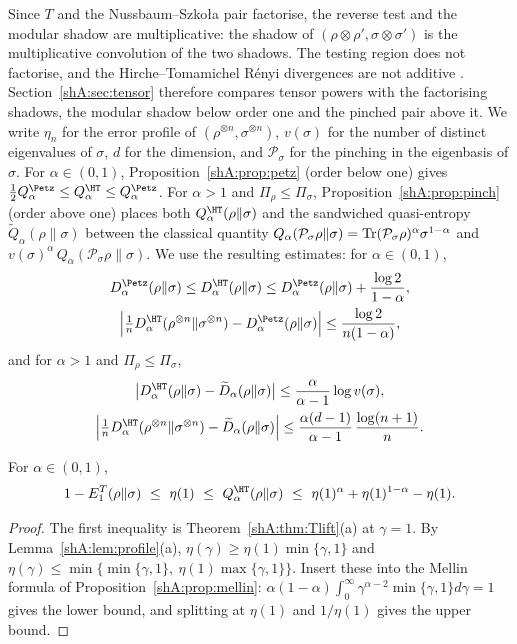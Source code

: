 Since $T$ and the Nussbaum--Szko{\l}a pair factorise, the reverse test and the modular shadow are multiplicative: the shadow of $(\rho\otimes\rho',\sigma\otimes\sigma')$ is the multiplicative convolution of the two shadows. The testing region does not factorise, and the Hirche--Tomamichel R\'enyi divergences are not additive \cite{HircheTomamichel2024}. Section~\ref{shA:sec:tensor} therefore compares tensor powers with the factorising shadows, the modular shadow below order one and the pinched pair above it. We write $\eta_n$ for the error profile of $(\rho^{\otimes n},\sigma^{\otimes n})$, $v(\sigma)$ for the number of distinct eigenvalues of $\sigma$, $d$ for the dimension, and $\mathcal P_\sigma$ for the pinching in the eigenbasis of $\sigma$. For $\alpha\in(0,1)$, Proposition~\ref{shA:prop:petz} (order below one) gives $\frac12Q^\Petz_\alpha\le Q^\HT_\alpha\le Q^\Petz_\alpha$. For $\alpha>1$ and $\Pi_\rho\le\Pi_\sigma$, Proposition~\ref{shA:prop:pinch} (order above one) places both $Q^\HT_\alpha(\rho\|\sigma)$ and the sandwiched quasi-entropy $\widetilde Q_\alpha(\rho\|\sigma)$ between the classical quantity $Q_\alpha(\mathcal P_\sigma\rho\|\sigma)=\operatorname{Tr}(\mathcal P_\sigma\rho)^\alpha\sigma^{1-\alpha}$ and $v(\sigma)^\alpha\,Q_\alpha(\mathcal P_\sigma\rho\|\sigma)$. We use the resulting estimates: for $\alpha\in(0,1)$,
\begin{gather*}
D^\Petz_\alpha(\rho\|\sigma)\le D^\HT_\alpha(\rho\|\sigma)\le D^\Petz_\alpha(\rho\|\sigma)+\frac{\log2}{1-\alpha},\\
\Big|\tfrac1nD^\HT_\alpha(\rho^{\otimes n}\|\sigma^{\otimes n})-D^\Petz_\alpha(\rho\|\sigma)\Big|\le\frac{\log2}{n(1-\alpha)},
\end{gather*}
and for $\alpha>1$ and $\Pi_\rho\le\Pi_\sigma$,
\begin{gather*}
\big|D^\HT_\alpha(\rho\|\sigma)-\widetilde D_\alpha(\rho\|\sigma)\big|\le\frac{\alpha}{\alpha-1}\log v(\sigma),\\
\Big|\tfrac1nD^\HT_\alpha(\rho^{\otimes n}\|\sigma^{\otimes n})-\widetilde D_\alpha(\rho\|\sigma)\Big|\le\frac{\alpha(d-1)}{\alpha-1}\,\frac{\log(n+1)}{n}.
\end{gather*}

\begin{proposition}\label{shB:prop:chernoff}
For $\alpha\in(0,1)$,
\[
1-E^T_1(\rho\|\sigma)\ \le\ \eta(1)\ \le\ Q^\HT_\alpha(\rho\|\sigma)\ \le\ \eta(1)^\alpha+\eta(1)^{1-\alpha}-\eta(1).
\]
\end{proposition}

\begin{proof}
The first inequality is Theorem~\ref{shA:thm:Tlift}(a) at $\gamma=1$. By Lemma~\ref{shA:lem:profile}(a), $\eta(\gamma)\ge\eta(1)\min\{\gamma,1\}$ and $\eta(\gamma)\le\min\{\min\{\gamma,1\},\ \eta(1)\max\{\gamma,1\}\}$. Insert these into the Mellin formula of Proposition~\ref{shA:prop:mellin}: $\alpha(1-\alpha)\int_0^\infty\gamma^{\alpha-2}\min\{\gamma,1\}d\gamma=1$ gives the lower bound, and splitting at $\eta(1)$ and $1/\eta(1)$ gives the upper bound.
\end{proof}

